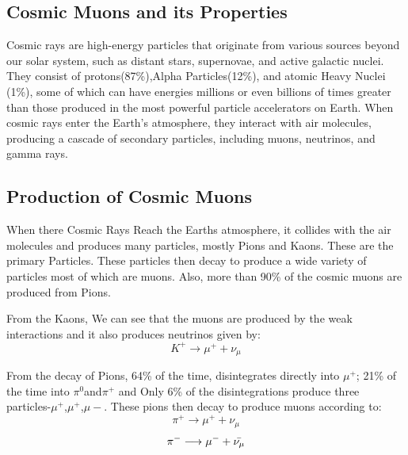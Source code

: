 \documentclass{article}
\begin{document}
\begin{multicols}{2}



\section{Cosmic Muons and its Properties}



Cosmic rays are high-energy particles that originate from various sources beyond our 
solar system, such as distant stars, supernovae, and active galactic nuclei. They consist of 
protons(87\%),Alpha Particles(12\%), and atomic Heavy Nuclei (1\%), some of which can have energies millions or even billions 
of times greater than those produced in the most powerful particle accelerators on Earth. When 
cosmic rays enter the Earth's atmosphere, they interact with air molecules, producing a cascade 
of secondary particles, including muons, neutrinos, and gamma rays.

\subsection{Production of Cosmic Muons}
When there Cosmic Rays Reach the Earths atmosphere, it collides with the air molecules and produces 
many particles, mostly Pions and Kaons. These are the primary Particles. These particles then decay to produce a wide variety
of particles most of which are muons. Also, more than 90\% of the cosmic muons are produced from Pions.

From the Kaons, We can see that the muons are produced by the weak interactions and it also produces neutrinos given by:
\begin{equation}
    K^{+} \longrightarrow \mu^{+} + \nu_{\mu}
\end{equation}

From the decay of Pions, 64\% of the time, disintegrates directly into $\mu^+$; 21\% of the time into $\pi^0$and$\pi^+$ and Only 6\% of the disintegrations produce three particles-$\mu^+$,$\mu^+$,$\mu-$. These pions then decay to produce muons according to:
\begin{equation}
    \pi^{+} \longrightarrow \mu^{+} + \nu_{\mu}
\end{equation}
\begin{equation}
    \pi^{-} \longrightarrow \mu^{-} + \Bar{\nu_{\mu}}
\end{equation}




\end{multicols}
\end{document}
